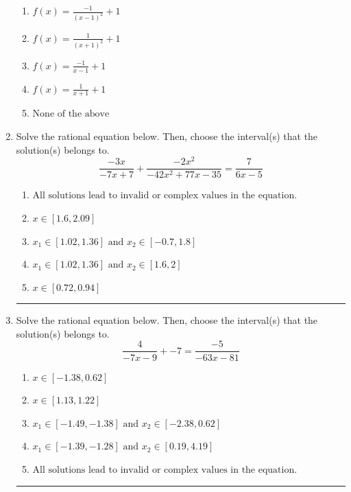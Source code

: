 \documentclass[14pt]{extbook}
\newcommand{\litem}[1]{\item#1\hspace*{-1cm}\rule{\textwidth}{0.4pt}}
\begin{document}
\begin{enumerate}
{\begin{center}
\end{center}
\begin{enumerate}[label=\Alph*.]
\item \( f(x) = \frac{-1}{(x - 1)^2} + 1 \)
\item \( f(x) = \frac{1}{(x + 1)^2} + 1 \)
\item \( f(x) = \frac{-1}{x - 1} + 1 \)
\item \( f(x) = \frac{1}{x + 1} + 1 \)
\item \( \text{None of the above} \)

\end{enumerate} }
\litem{
Solve the rational equation below. Then, choose the interval(s) that the solution(s) belongs to.\[ \frac{-3x}{-7x + 7} + \frac{-2x^{2}}{-42x^{2} +77 x -35} = \frac{7}{6x -5} \]\begin{enumerate}[label=\Alph*.]
\item \( \text{All solutions lead to invalid or complex values in the equation.} \)
\item \( x \in [1.6,2.09] \)
\item \( x_1 \in [1.02, 1.36] \text{ and } x_2 \in [-0.7,1.8] \)
\item \( x_1 \in [1.02, 1.36] \text{ and } x_2 \in [1.6,2] \)
\item \( x \in [0.72,0.94] \)

\end{enumerate} }
\litem{
Solve the rational equation below. Then, choose the interval(s) that the solution(s) belongs to.\[ \frac{4}{-7x -9} + -7 = \frac{-5}{-63x -81} \]\begin{enumerate}[label=\Alph*.]
\item \( x \in [-1.38,0.62] \)
\item \( x \in [1.13,1.22] \)
\item \( x_1 \in [-1.49, -1.38] \text{ and } x_2 \in [-2.38,0.62] \)
\item \( x_1 \in [-1.39, -1.28] \text{ and } x_2 \in [0.19,4.19] \)
\item \( \text{All solutions lead to invalid or complex values in the equation.} \)


\end{enumerate}}
\end{enumerate}
\end{document}
